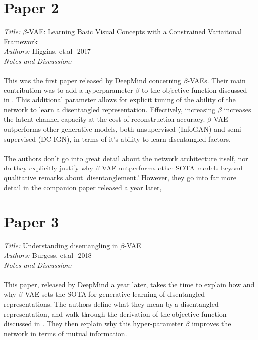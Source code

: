 \documentclass[justified,nobib]{tufte-handout}
\begin{document}
\begin{fullwidth}
\section{Paper 2}
\textit{Title:} $\beta$-VAE: Learning Basic Visual Concepts with a Constrained Variaitonal Framework  \cite{bvae} \\
\textit{Authors: }Higgins, et.al- 2017 \\
\textit{Notes and Discussion:}
\paragraph{} This was the first paper released by DeepMind concerning $\beta$-VAEs. Their main contribution was to add a hyperparameter $\beta$ to the objective function discussed in \citep{ae}. This additional parameter allows for explicit tuning of the ability of the network to learn a disentangled representation. Effectively, increasing $\beta$ increases the latent channel capacity at the cost of reconstruction accuracy. $\beta$-VAE outperforms other generative models, both unsupervised (InfoGAN) and semi-supervised (DC-IGN), in terms of it's ability to learn disentangled factors. 
\paragraph{} The authors don't go into great detail about the network architecture itself, nor do they explicitly justify why $\beta$-VAE outperforms other SOTA models beyond qualitative remarks about `disentanglement.' However, they go into far more detail in the companion paper released a year later, \citep{bvae-dis}    \\
\clearpage
\section{Paper 3}
\textit{Title:} Understanding disentangling in  $\beta$-VAE  \cite{bvae-dis} \\
\textit{Authors: }Burgess, et.al- 2018 \\
\textit{Notes and Discussion:} \\
\paragraph{} This paper, released by DeepMind a year later, takes the time to explain how and why $\beta$-VAE sets the SOTA for generative learning of disentangled representations. The authors define what they mean by a disentangled representation, and walk through the derivation of the objective function discussed in \citep{ae}. They then explain why  this hyper-parameter $\beta$ improves the network in terms of mutual information.

\end{fullwidth}
\end{document}
